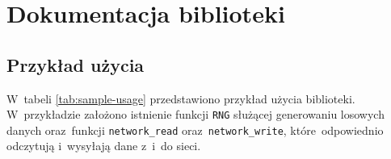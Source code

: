 \chapter{Dokumentacja biblioteki}
\label{app:docs}
\section{Przykład użycia}



W~tabeli \ref{tab:sample-usage} przedstawiono przykład użycia biblioteki. W~przykładzie założono istnienie funkcji \texttt{RNG} służącej generowaniu losowych danych oraz~funkcji \texttt{network\_read} oraz~\texttt{network\_write}, które~odpowiednio odczytują i~wysyłają dane z~i~do sieci.

